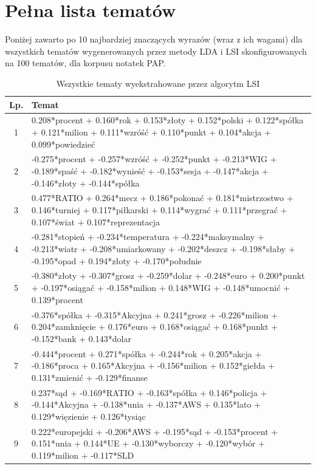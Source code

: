\documentclass[11pt,a4paper]{article}
\begin{document}
\pagebreak

\section{Pełna lista tematów}
\label{sec:full-results}

Poniżej zawarto po 10 najbardziej znaczących wyrazów (wraz z ich wagami) dla
wszystkich tematów wygenerowanych przez metody LDA i LSI skonfigurowanych na
100 tematów, dla korpusu notatek PAP.


\begin{table}[h]
\caption{Wszystkie tematy wyekstrahowane przez algorytm LSI}
\begin{tabular}{|c|>{\footnotesize}p{\linewidth}|}
\hline
Lp. & Temat \\\hline

1 & 0.208*procent + 0.160*rok + 0.153*złoty + 0.152*polski + 0.122*spółka + 0.121*milion + 0.111*wzróść + 0.110*punkt + 0.104*akcja + 0.099*powiedzieć\\\hline
2 & -0.275*procent + -0.257*wzróść + -0.252*punkt + -0.213*WIG + -0.189*spaść + -0.182*wynieść + -0.153*sesja + -0.147*akcja + -0.146*złoty + -0.144*spółka\\\hline
3 & 0.477*RATIO + 0.264*mecz + 0.186*pokonać + 0.181*mistrzostwo + 0.146*turniej + 0.117*piłkarski + 0.114*wygrać + 0.111*przegrać + 0.107*świat + 0.107*reprezentacja\\\hline
4 & -0.281*stopień + -0.234*temperatura + -0.224*maksymalny + -0.213*wiatr + -0.208*umiarkowany + -0.202*deszcz + -0.198*słaby + -0.195*opad + 0.194*złoty + -0.170*południe\\\hline
5 & -0.380*złoty + -0.307*grosz + -0.259*dolar + -0.248*euro + 0.200*punkt + -0.197*osiągać + -0.158*milion + 0.148*WIG + -0.148*umocnić + 0.139*procent\\\hline
6 & -0.376*spółka + -0.315*Akcyjna + 0.241*grosz + -0.226*milion + 0.204*zamknięcie + 0.176*euro + 0.168*osiągać + 0.168*punkt + -0.152*bank + 0.143*dolar\\\hline
7 & -0.444*procent + 0.271*spółka + -0.244*rok + 0.205*akcja + -0.186*proca + 0.165*Akcyjna + -0.156*milion + 0.152*giełda + 0.131*zmienić + -0.129*finanse\\\hline
8 & 0.237*sąd + -0.169*RATIO + -0.163*spółka + 0.146*policja + -0.144*Akcyjna + -0.138*unia + -0.137*AWS + 0.135*lato + 0.129*więzienie + 0.126*tysiąc\\\hline
9 & 0.222*europejski + -0.206*AWS + -0.195*sąd + -0.153*procent + 0.151*unia + 0.144*UE + -0.130*wyborczy + -0.120*wybór + 0.119*milion + -0.117*SLD\\\hline

\end{tabular}
\end{table}
\end{document}

